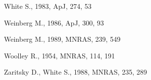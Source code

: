 \documentclass[twocolumn]{aastex63}
\begin{document}
\begin{thebibliography}{}
White S., 1983, ApJ, 274, 53

Weinberg M., 1986, ApJ, 300, 93

Weinberg M., 1989, MNRAS, 239, 549

Woolley R., 1954, MNRAS, 114, 191

Zaritsky D., White S., 1988, MNRAS, 235, 289

\end{thebibliography}
\end{document}
